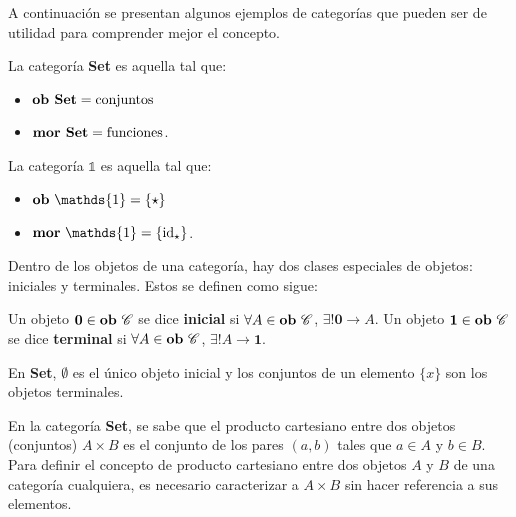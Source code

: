 A continuación se presentan algunos ejemplos de categorías que pueden ser de utilidad para comprender mejor el concepto.

\begin{ejemplo}
La categoría \textbf{Set} es aquella tal que:
\begin{itemize}[noitemsep,label=$\blacktriangleright$]
	\item $\text{\bf ob Set} = \text{conjuntos}$
	\item $\text{\bf mor Set} = \text{funciones}$. 
\end{itemize}
\end{ejemplo}
\begin{ejemplo}
La categoría $\mathds{1}$ es aquella tal que:
\begin{itemize}[noitemsep,label=$\blacktriangleright$]
	\item $\text{\bf ob} \ \mathds{1} = \{\star\}$
	\item $\text{\bf mor} \ \mathds{1} = \{\text{id}_{\star}\}$. 
\end{itemize}
\end{ejemplo}

Dentro de los objetos de una categoría, hay dos clases especiales de objetos: iniciales y terminales. Estos se definen como sigue:

\begin{definition}
Un objeto $\mathbf{0} \in \text{\bf ob} \ \mathscr{C}$ se dice \textbf{inicial} si $\forall A \in \text{\bf ob} \ \mathscr{C}$, $\exists! \mathbf{0} \rightarrow A$. 
Un objeto $\mathbf{1} \in \text{\bf ob} \ \mathscr{C}$ se dice \textbf{terminal} si $\forall A \in \text{\bf ob} \ \mathscr{C}$, $\exists! A \rightarrow \mathbf{1}$.
\end{definition}

\begin{ejemplo} 
En \textbf{Set}, $\emptyset$ es el único objeto inicial y los conjuntos de un elemento $\{x\}$ son los objetos terminales.
\end{ejemplo}

En la categoría \textbf{Set}, se sabe que el producto cartesiano entre dos objetos (conjuntos) $A \times B$ es el conjunto de los pares $(a,b)$ tales que $a \in A$ y $b \in B$. Para definir el concepto de producto cartesiano entre dos objetos $A$ y $B$ de una categoría cualquiera, es necesario caracterizar a $A \times B$ sin hacer referencia a sus elementos. 

